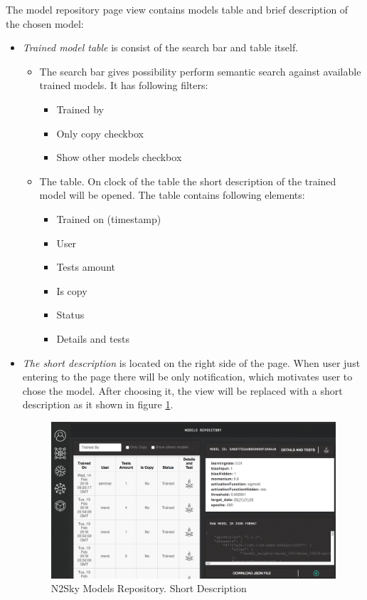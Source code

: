 The model repository page view contains models table and brief description of  the chosen model:
\begin{itemize}
\item \emph{Trained model table} is consist of the search bar and table itself.
\begin{itemize}
\item The search bar gives possibility perform semantic search against available trained models. It has following filters:
\begin{itemize}
\item Trained by
\item Only copy checkbox
\item Show other models checkbox
\end{itemize}
\item The table. On clock of the table the short description of the trained model will be opened. The table contains following elements:
\begin{itemize}
\item Trained on (timestamp)
\item User
\item Tests amount
\item Is copy
\item Status
\item Details and tests
\end{itemize}
\end{itemize}

\item \emph{The short description} is located on the right side of the page. When user just entering to the page there will be only notification, which motivates user to chose the model. After choosing it, the view will be replaced with a short description as it shown in figure \ref{fig:short_desc}.

\begin{figure}[htbp]
\begin{center}
  \includegraphics[width=\linewidth]{components/5/img/short_desc.png}
  \caption{N2Sky Models Repository. Short Description}
  \label{fig:short_desc}
\end{center}
\end{figure} 


\end{itemize}
